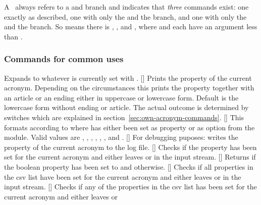 \documentclass{acro-manual}
\begin{document}
A \TF\ always refers to a  and  branch and indicates
that \emph{three} commands exist: one exactly as described, one with only the
\code{\textcolor{cs}{T}} and the  branch, and one with only the
\code{\textcolor{cs}{F}} and the  branch.  So  means
there is , , and , where 
and  each have an argument less than .

\subsubsection{Commands for common uses}
\begin{commands}
  \expandable{}
    Expands to whatever is currently set with
    \code{/}.
  []
    Prints the property  of the current acronym.  Depending on
    the circumstances this prints the property together with an article or an
    ending either in uppercase or lowercase form.  Default is the lowercase
    form without ending or article. The actual outcome is determined by
    switches which are explained in section~\vref{sec:own-acronym-commands}.
  []
    This formats  according to  where  has
    either been set as property or as option from the  module.
    Valid values are , , , ,
    , , and .
  []
    For debugging puposes: writes the property  of the current
    acronym to the log file.
  []
    Checks if the property  has been set for the current
    acronym and either leaves  or  in the input stream.
  []
    Returns  if the boolean property
     has been set to  and  otherwise.
  []
    Checks if all properties in the csv list  have been set
    for the current acronym and either leaves  or  in
    the input stream.
  []
    Checks if any of the properties in the csv list  has been
    set for the current acronym and either leaves  or 

\end{commands}
\end{document}
